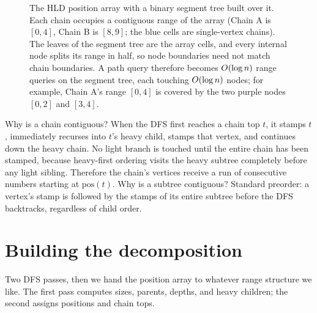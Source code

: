 \begin{figure}[H]
\caption{The HLD position array with a binary segment tree built over it. Each chain occupies a
contiguous range of the array (Chain A is $[0,4]$, Chain B is $[8,9]$; the blue cells are
single-vertex chains). The leaves of the segment tree are the array cells, and every internal node
splits its range in half, so node boundaries need not match chain boundaries. A path query therefore
becomes $O(\log n)$ range queries on the segment tree, each touching $O(\log n)$ nodes; for
example, Chain A's range $[0,4]$ is covered by the two purple nodes $[0,2]$ and $[3,4]$.}
\label{ch19:fig-array}
\end{figure}

\begin{whybox}
Why is a chain contiguous? When the DFS first reaches a chain top $t$, it stamps $t$, immediately
recurses into $t$'s heavy child, stamps that vertex, and continues down the heavy chain. No light
branch is touched until the entire chain has been stamped, because heavy-first ordering visits the
heavy subtree completely before any light sibling.
Therefore the chain's vertices receive a run of consecutive numbers starting at $\mathrm{pos}(t)$. Why
is a subtree contiguous? Standard preorder: a vertex's stamp is followed by the stamps of its entire
subtree before the DFS backtracks, regardless of child order.
\end{whybox}

\section{Building the decomposition}
\label{ch19:build}

Two DFS passes, then we hand the position array to whatever range structure we like. The first pass
computes sizes, parents, depths, and heavy children; the second assigns positions and chain tops.

